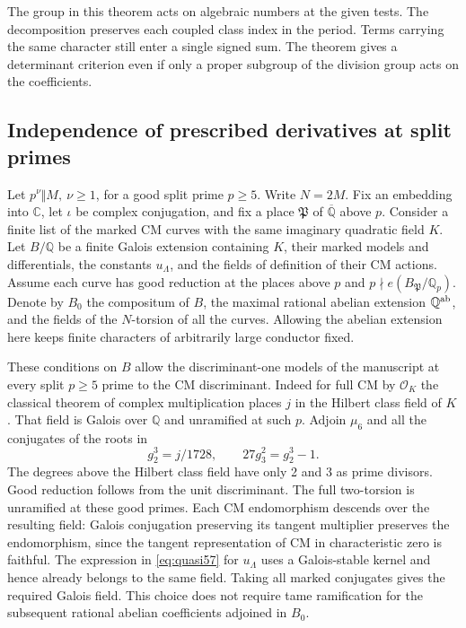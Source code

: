 \documentclass[a4paper,11pt]{article}
\theoremstyle{definition}
\theoremstyle{remark}
\numberwithin{equation}{section}
\begin{document}
The group in this theorem acts on algebraic numbers at the
given tests. The decomposition preserves each coupled class
index in the period. Terms carrying the same character still
enter a single signed sum. The theorem gives a determinant
criterion even if only a proper subgroup of the division group
acts on the coefficients.


\subsection{Independence of prescribed derivatives at split primes}
\label{sec:indepder494}

Let \(p^\nu\Vert M,\ \nu\ge1\), for a good split prime \(p\ge5\).
Write \(N=2M\). Fix an embedding into \(\mathbb C\), let \(\iota\)
be complex conjugation, and fix a place \(\mathfrak P\) of
\(\overline{\mathbb Q}\) above \(p\). Consider a finite list of
the marked CM curves with the same imaginary quadratic field
\(K\). Let \(B/\mathbb Q\) be a finite Galois extension containing
\(K\), their marked models and differentials, the constants
\(u_\Lambda\), and the fields of definition of their CM actions.
Assume each curve has good reduction at the places above \(p\)
and \(p\nmid e(B_{\mathfrak P}/\mathbb Q_p)\).
Denote by \(B_0\) the compositum of \(B\), the maximal rational
abelian extension \(\mathbb Q^{\rm ab}\), and the fields of the
\(N\)-torsion of all the curves. Allowing the abelian extension
here keeps finite characters of arbitrarily large conductor fixed.

These conditions on \(B\) allow the discriminant-one models of
the manuscript at every split \(p\ge5\) prime to the CM discriminant.
Indeed for full CM by \(\mathcal O_K\) the classical theorem of
complex multiplication places \(j\) in the Hilbert class field of
\(K\). That field is Galois over \(\mathbb Q\) and unramified at
such \(p\). Adjoin \(\mu_6\) and all the conjugates of the roots
in
\[
          g_2^3=j/1728,\qquad 27g_3^2=g_2^3-1 .
\]
The degrees above the Hilbert class field have only 2 and 3
as prime divisors. Good reduction follows from the unit
discriminant. The full two-torsion is unramified at these good
primes. Each CM endomorphism descends over the resulting field:
Galois conjugation preserving its tangent multiplier preserves
the endomorphism, since the tangent representation of CM in
characteristic zero is faithful. The expression
in \eqref{eq:quasi57} for \(u_\Lambda\) uses a Galois-stable
kernel and hence already belongs to the same field. Taking all
marked conjugates gives the required Galois field. This choice
does not require tame ramification for the subsequent rational
abelian coefficients adjoined in \(B_0\).
\end{document}
